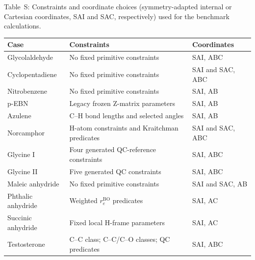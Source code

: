 \documentclass[12pt]{article}
\renewcommand{\thetable}{S\arabic{table}}
\begin{document}
\begin{center}
\label{tab:si-reproducibility}
\parbox{0.94\linewidth}{\small Table~\thetable: Constraints and coordinate
choices (symmetry-adapted internal or Cartesian coordinates, SAI and SAC,
respectively) used for the benchmark calculations.}

\smallskip
\begin{tabular}{lll}
\toprule
Case & Constraints & Coordinates \\
\midrule
Glycolaldehyde  & No fixed primitive constraints         & SAI, ABC \\
Cyclopentadiene & No fixed primitive constraints         & SAI and SAC, ABC \\
Nitrobenzene    & No fixed primitive constraints         & SAI, AB \\
p-EBN           & Legacy frozen Z-matrix parameters      & SAI, AB \\
Azulene         & C--H bond lengths and selected angles  & SAI, AB \\
Norcamphor      & H-atom constraints and Kraitchman predicates & SAI and SAC, ABC \\
Glycine I       & Four generated QC-reference constraints        & SAI, ABC \\
Glycine II      & Five generated QC constraints      & SAI, ABC \\
Maleic anhydride & No fixed primitive constraints        & SAI and SAC, AB \\
Phthalic anhydride & Weighted $r_e^\mathrm{BO}$ predicates & SAI, AC \\
Succinic anhydride & Fixed local H-frame parameters       & SAI, AC \\
Testosterone & C--C class; C--C/C--O classes; QC predicates   & SAI, ABC \\
\bottomrule
\end{tabular}
\end{center}
\end{document}
